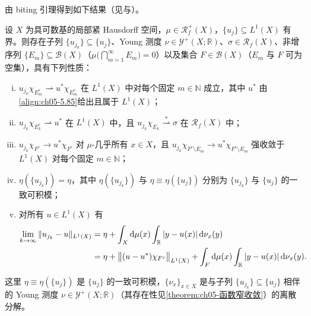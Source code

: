 \documentclass[../../main.tex]{subfiles}
\begin{document}
由 biting 引理得到如下结果（见\cite[Theorem 4.5]{ref92}与\cite[Section 2]{ref04}）。

\begin{theorem}\label{theorem:ch05-分解}
设 $X$ 为具可数基的局部紧 Hausdorff 空间，$\mu\in\mathscr{R}^+_f(X)$，$\{u_j\}\subseteq L^1(X)$ 有界。则存在子列 $\{u_{j_k}\}\subseteq\{u_j\}$、Young 测度 $\nu\in\mathcal{Y}^+(X;\mathbb{R})$、$\sigma\in\mathscr{R}_f(X)$、非增序列 $\{E_m\}\subseteq\mathscr{B}(X)$（$\mu\big(\bigcap_{m=1}^\infty E_m\big)=0$）以及集合 $F\in\mathscr{B}(X)$（$E_m$ 与 $F$ 可为空集），具有下列性质：
\begin{enumerate}[(i)]
\item\label{item:ch05-fenjie-i} $u_{j_k}\chi_{E_m^c}\rightharpoonup u^*\chi_{E_m^c}$ 在 $L^1(X)$ 中对每个固定 $m\in\mathbb{N}$ 成立，其中 $u^*$ 由\eqref{align:ch05-5.85}给出且属于 $L^1(X)$；
\item\label{item:ch05-fenjie-ii} $u_{j_k}\chi_{E_k^c}\rightharpoonup u^*$ 在 $L^1(X)$ 中，且 $u_{j_k}\chi_{E_k}\stackrel{*}{\rightharpoonup}\sigma$ 在 $\mathscr{R}_f(X)$ 中；
\item\label{item:ch05-fenjie-iii} $u_{j_k}\chi_{F^c}\to u^*\chi_{F^c}$ 对 $\mu$-几乎所有 $x\in X$，且 $u_{j_k}\chi_{F^c\setminus E_m}\to u^*\chi_{F^c\setminus E_m}$ 强收敛于 $L^1(X)$ 对每个固定 $m\in\mathbb{N}$；
\item\label{item:ch05-fenjie-iv} $\eta(\{u_{j_k}\})=\eta$，其中 $\eta(\{u_{j_k}\})$ 与 $\eta\equiv\eta(\{u_j\})$ 分别为 $\{u_{j_k}\}$ 与 $\{u_j\}$ 的一致可积模；
\item\label{item:ch05-fenjie-v} 对所有 $u\in L^1(X)$ 有
\begin{align}
\lim_{k\to\infty}\|u_{j_k}-u\|_{L^1(X)}
&=\eta+\int_X\mathrm{d}\mu(x)\int_{\mathbb{R}}|y-u(x)|\,\mathrm{d}\nu_x(y)\notag\\
&=\eta+\big\|(u-u^*)\chi_{F^c}\big\|_{L^1(X)}
+\int_F\mathrm{d}\mu(x)\int_{\mathbb{R}}|y-u(x)|\,\mathrm{d}\nu_x(y).\label{align:ch05-5.96}
\end{align}
\end{enumerate}
这里 $\eta\equiv\eta(\{u_j\})$ 是 $\{u_j\}$ 的一致可积模，$\{\nu_x\}_{x\in X}$ 是与子列 $\{u_{j_k}\}\subseteq\{u_j\}$ 相伴的 Young 测度 $\nu\in\mathcal{Y}^+(X;\mathbb{R})$（其存在性见\cref{theorem:ch05-函数窄收敛}）的离散分解。
\end{theorem}
\end{document}
